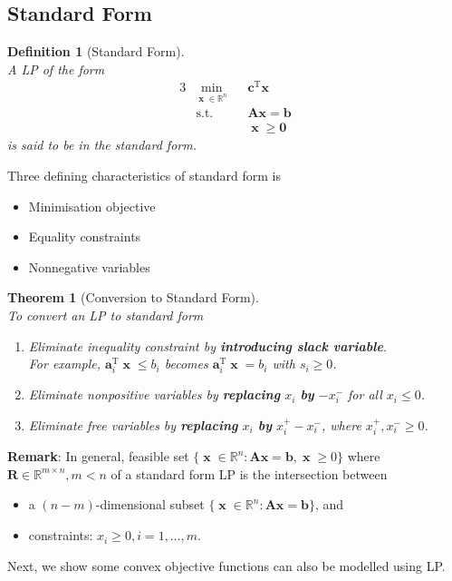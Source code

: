 \documentclass[12pt]{article}
\newcommand{\st}{\mathrm{s.t.}}
\newcommand{\T}{\mathrm{T}}
\newcommand{\va}{\mathbf{a}}
\newtheorem{definition}{Definition}[section]
\newtheorem{theorem}{Theorem}[section]
\theoremstyle{definition}
\DeclareMathOperator{\x}{\mathbf{x}}
\begin{document}
\subsection{Standard Form}
\begin{definition}[Standard Form]
\hfill\\\normalfont A LP of the form
\begin{alignat*}{3}
&\min_{\x\in\mathbb{R}^n} &&\mathbf{c}^\T\mathbf{x}\\
&\st&&\mathbf{Ax}=\mathbf{b}\\
&&&\x\geq \mathbf{0}
\end{alignat*}
is said to be in the standard form.
\end{definition}
Three defining characteristics of standard form is
\begin{itemize}
  \item Minimisation objective 
  \item Equality constraints 
  \item Nonnegative variables
\end{itemize}
\begin{theorem}[Conversion to Standard Form]
\hfill\\\normalfont To convert an LP to standard form
\begin{enumerate}
  \item Eliminate inequality constraint by \textbf{introducing slack variable}.\\
  For example, $\va_i^\T\x\leq b_i$ becomes $\va_i^\T\x = b_i$ with $s_i\geq 0$.
  \item Eliminate nonpositive variables by \textbf{replacing} $x_i$ \textbf{by} $-x_i^-$ for all $x_i\leq 0$.
  \item Eliminate free variables by \textbf{replacing} $x_i$ \textbf{by} $x_i^+-x_i^-$, where $x_i^+, x_i^-\geq 0$. 
\end{enumerate}
\end{theorem}
\textbf{Remark}: In general, feasible set $\{\x\in\mathbb{R}^n:\mathbf{Ax}=\mathbf{b}, \x\geq 0\}$ where $\mathbf{R}\in\mathbb{R}^{m\times n}, m<n$ of a standard form LP is the intersection between
\begin{itemize}
\item a $(n-m)$-dimensional subset $\{\x\in\mathbb{R}^n: \mathbf{Ax}=\mathbf{b}\}$, and
\item constraints: $x_i\geq 0, i=1,\ldots, m$.
\end{itemize}
Next, we show some convex objective functions can also be modelled using LP.
\end{document}
